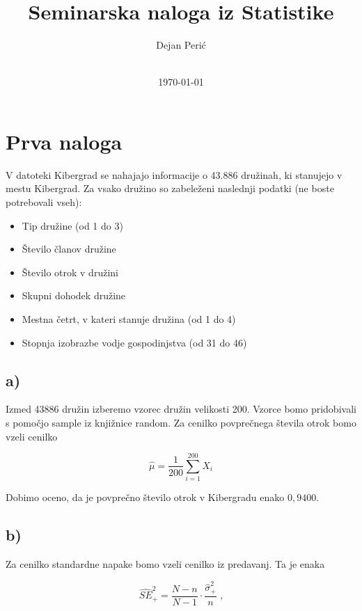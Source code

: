 \documentclass[12pt, a4paper]{article}
\title{Seminarska naloga iz Statistike}
\author{Dejan Perić \\~ \\ }
\date{\today}
\begin{document}

\maketitle




\section{Prva naloga}

V datoteki Kibergrad se nahajajo informacije o 43.886 družinah, 
ki stanujejo v mestu Kibergrad. Za vsako družino so zabeleženi 
naslednji podatki (ne boste potrebovali vseh):

\begin{itemize}
    \item Tip družine (od 1 do 3)
    \item Število članov družine
    \item Število otrok v družini
    \item Skupni dohodek družine
    \item Mestna četrt, v kateri stanuje družina (od 1 do 4)
    \item Stopnja izobrazbe vodje gospodinjstva (od 31 do 46)
\end{itemize}
    
\subsection{a)}

Izmed 43886 družin izberemo vzorec družin velikosti 200. Vzorce bomo pridobivali s pomočjo sample iz knjižnice random. Za cenilko povprečnega števila otrok bomo vzeli cenilko

$$\hat{\mu} = \frac{1}{200}\sum^{200}_{i=1} X_i $$

Dobimo oceno, da je povprečno število otrok v Kibergradu enako $0,9400$.

\subsection{b)}

Za cenilko standardne napake bomo vzeli cenilko iz predavanj. Ta je enaka 

$$ \hat{SE}_+^2 = \frac{N-n}{N-1} \cdot \frac{\hat{\sigma}_+^2}{n} \text{ ,}$$
\end{document}
